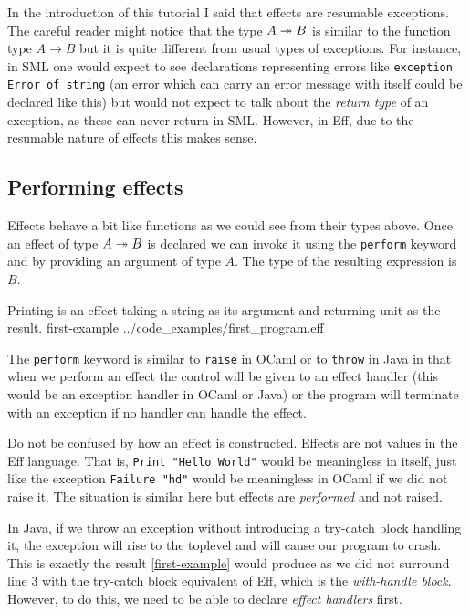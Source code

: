 \documentclass[class=article, crop=false]{standalone}
\begin{document}
In the introduction of this tutorial I said that effects are resumable
exceptions. The careful reader might notice that the type $A \twoheadrightarrow B$ is similar
to the function type $A \to B$ but it is quite different from usual types of
exceptions. For instance, in SML \cite{milner1997definition} one would expect
to see declarations representing errors like
\lstinline{exception Error of string} (an error which can carry an error message
with itself could be declared like this) but would not expect to talk about the
\emph{return type} of an exception, as these can never return in SML. However,
in Eff, due to the resumable nature of effects this makes sense.

\subsection{Performing effects}

Effects behave a bit like functions as we could see from their types above.
Once an effect of type $A \twoheadrightarrow B$ is declared we can invoke it
using the \lstinline{perform} keyword and by providing an argument of type $A$.
The type of the resulting expression is $B$.

{Printing is an effect taking a string as its argument and returning unit as the result.}
{first-example}
{../code_examples/first_program.eff}

The \lstinline{perform} keyword is similar to \lstinline|raise| in OCaml or to
\lstinline|throw| in Java in that when we perform an effect the control will be
given to an effect handler (this would be an exception handler in OCaml or Java)
or the program will terminate with an exception if no handler can handle the
effect.

Do not be confused by how an effect is constructed. Effects are not values in
the Eff language. That is, \lstinline{Print "Hello World"} would be meaningless
in itself, just like the exception \lstinline{Failure "hd"} would be meaningless
in OCaml if we did not raise it. The situation is similar here but effects are
\emph{performed} and not raised.

In Java, if we throw an exception without introducing a try-catch block handling
it, the exception will rise to the toplevel and will cause our program to crash.
This is exactly the result \autoref{first-example} would produce as we did not
surround line 3 with the try-catch block equivalent of Eff, which is the
\emph{with-handle block}. However, to do this, we need to be able to declare
\emph{effect handlers} first.
\end{document}
